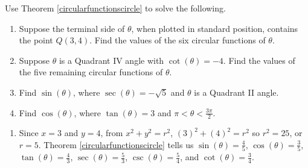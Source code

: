 \documentclass{ximera}
\begin{document}
\begin{example} \label{circularfunctionscircleex}  Use Theorem \ref{circularfunctionscircle} to solve the following.

\begin{enumerate}

\item  Suppose the terminal side of $\theta$, when plotted in standard position, contains the point $Q(3,4)$.  Find the values of the six circular functions of $\theta$.

\item  Suppose $\theta$ is a Quadrant IV angle with $\cot(\theta) = -4$.  Find the values of the five remaining circular functions of $\theta$.

\item Find $\sin\left(\theta\right)$, where $\sec(\theta) = -\sqrt{5}$ and $\theta$ is a Quadrant II angle.

\item \label{commontanmistake} Find $\cos\left(\theta\right)$, where $\tan(\theta) = 3$ and $\pi < \theta < \frac{3\pi}{2}$.

\end{enumerate}

\begin{explanation}

\begin{enumerate}

\item    Since $x = 3$ and $y=4$, from $x^2+y^2 = r^2$, $(3)^2+(4)^2 = r^2$ so $r^2 = 25$, or $r = 5$. Theorem \ref{circularfunctionscircle} tells us $\sin(\theta) = \frac{4}{5}$, $\cos(\theta) = \frac{3}{5}$,  $\tan(\theta) = \frac{4}{3}$, $\sec(\theta) = \frac{5}{3}$, $\csc(\theta) = \frac{5}{4}$,  and $\cot(\theta) = \frac{3}{4}$.

\begin{image}
\end{image}
\end{enumerate}
\end{explanation}
\end{example}
\end{document}

